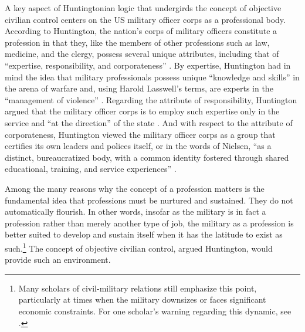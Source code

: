 \documentclass[
  12pt,
  oneside]{memoir}
\begin{document}
A key aspect of Huntingtonian logic that undergirds the concept of objective civilian control centers on the US military officer corps as a professional body. According to Huntington, the nation's corps of military officers constitute a profession in that they, like the members of other professions such as law, medicine, and the clergy, possess several unique attributes, including that of ``expertise, responsibility, and corporateness'' \autocite[8-10]{huntington_soldier_1957}. By expertise, Huntington had in mind the idea that military professionals possess unique ``knowledge and skills'' in the arena of warfare \autocite[8-10]{huntington_soldier_1957} and, using Harold Lasswell's terms, are experts in the ``management of violence'' \autocite[Lasswell quoted in][11]{huntington_soldier_1957}. Regarding the attribute of responsibility, Huntington argued that the military officer corps is to employ such expertise only in the service and ``at the direction'' of the state \autocite[370]{nielsen_american_2012}. And with respect to the attribute of corporateness, Huntington viewed the military officer corps as a group that certifies its own leaders and polices itself, or in the words of Nielsen, ``as a distinct, bureaucratized body, with a common identity fostered through shared educational, training, and service experiences'' \autocite[370]{nielsen_american_2012}.

Among the many reasons why the concept of a profession matters is the fundamental idea that professions must be nurtured and sustained. They do not automatically flourish. In other words, insofar as the military is in fact a profession rather than merely another type of job, the military as a profession is better suited to develop and sustain itself when it has the latitude to exist as such.\footnote{Many scholars of civil-military relations still emphasize this point, particularly at times when the military downsizes or faces significant economic constraints. For one scholar's warning regarding this dynamic, see \textcite{snider_once_2012}.} The concept of objective civilian control, argued Huntington, would provide such an environment.
\end{document}
